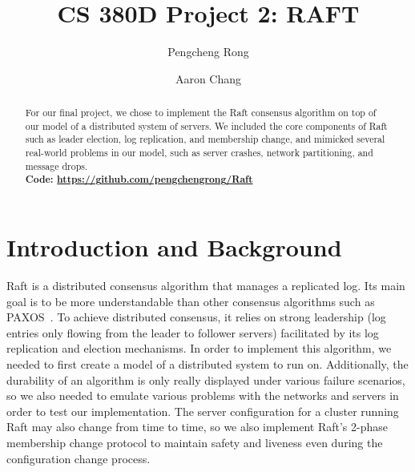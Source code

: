 \documentclass[letterpaper,twocolumn,10pt]{article}
\begin{document}

\graphicspath{ {./images/} }

\date{}

\title{\Large \bf CS 380D Project 2: RAFT}

\author{
{\rm Pengcheng Rong}\\
\and
{\rm Aaron Chang}\\
} %

\maketitle

\begin{abstract}

For our final project, we chose to implement the Raft consensus algorithm on top of our model of a distributed system of servers. We included the core components of Raft such as leader election, log replication, and membership change, and mimicked several real-world problems in our model, such as server crashes, network partitioning, and message drops. \\
\textbf{Code: \url{https://github.com/pengchengrong/Raft}}
\end{abstract}

\section{Introduction and Background}

Raft \cite{ref:raft} is a distributed consensus algorithm that manages a replicated log. Its main goal is to be more understandable than other consensus algorithms such as PAXOS~\cite{ref:paxos}. To achieve distributed consensus, it relies on strong leadership (log entries only flowing from the leader to follower servers) facilitated by its log replication and election mechanisms. In order to implement this algorithm, we needed to first create a model of a distributed system to run on. Additionally, the durability of an algorithm is only really displayed under various failure scenarios, so we also needed to emulate various problems with the networks and servers in order to test our implementation. The server configuration for a cluster running Raft may also change from time to time, so we also implement Raft's 2-phase membership change protocol to maintain safety and liveness even during the configuration change process.
\end{document}
